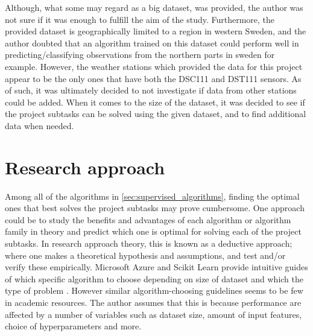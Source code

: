 	 Although, what some may regard as a big dataset, was provided, the author was not sure if it was enough to fulfill the aim of the study. Furthermore, the provided dataset is geographically limited to a region in western Sweden, and the author doubted that an algorithm trained on this dataset could perform well in predicting/classifying observations from the northern parts in sweden for example. However, the weather stations which provided the data for this project appear to be the only ones that have both the DSC111 and DST111 sensors. As of such, it was ultimately decided to not investigate if data from other stations could be added. When it comes to the size of the dataset, it was decided to see if the project subtasks can be solved using the given dataset, and to find additional data when needed.



\section{Research approach}
		Among all of the algorithms in \ref{sec:supervised_algorithms}, finding the optimal ones that best solves the project subtasks may prove cumbersome. One approach could be to study the benefits and advantages of each algorithm or algorithm family in theory and predict which one is optimal for solving each of the project subtasks. In research approach theory, this is known as a deductive approach; where one makes a theoretical hypothesis and assumptions, and test and/or verify these empirically. Microsoft Azure and Scikit Learn provide intuitive guides of which specific algorithm to choose depending on size of dataset and which the type of problem \cite{WEBSITE:20, WEBSITE:21}. However similar algorithm-choosing guidelines seems to be few in academic resources. The author assumes that this is because performance are affected by a number of variables such as dataset size, amount of input features, choice of hyperparameters and more. 


